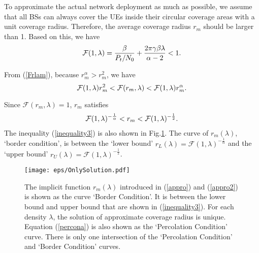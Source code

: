 \documentclass[final]{IEEEtran}
\begin{document}
\indent To approximate the actual network deployment as much as possible, we assume that all BSs can always cover the UEs inside their circular coverage areas with a unit coverage radius. Therefore, the average coverage radius $r_m$ should be larger than 1. Based on this, we have 
\begin{equation}
{\mathcal{F}}(1,\lambda)=\displaystyle\frac{\beta}{P_t/N_0}+\frac{2\pi \gamma\beta\lambda}{\alpha-2}<1.
\end{equation}

\indent From (\ref{Frlam}), because $r_m^{\alpha}>r_m^{2}$, we have
\begin{equation}
\displaystyle\mathcal{F}(1,\lambda)r_{m}^{2}<{\mathcal{F}}(r_{m},\lambda)
<\displaystyle\mathcal{F}(1,\lambda)r_{m}^{\alpha}.
\label{inequality2}
\end{equation}

Since $\mathcal{F}(r_m,\lambda)=1$,  $r_{m}$ satisfies 
\begin{equation}
\begin{array}{@{}r@{}l}
\displaystyle\mathcal{F}(1,\lambda)^{-\frac{1}{\alpha}}<r_{m}<\mathcal{F}(1,\lambda)^{-\frac{1}{2}}.
\end{array}
\label{inequality3}
\end{equation}
\indent The inequality (\ref{inequality3}) is also shown in Fig.\ref{fig:onlysolution}. The curve of $r_{m}(\lambda)$, \ie `border condition', is between the `lower bound' $r_L(\lambda)=\mathcal{F}(1,\lambda)^{-\frac{1}{\alpha}}$ and the `upper bound' $r_U(\lambda)=\mathcal{F}(1,\lambda)^{-\frac{1}{2}}$.\\
\begin{figure}
    \centering
    \texttt{[image: eps/OnlySolution.pdf]}
    \caption{The implicit function $r_{m}(\lambda)$ introduced in (\ref{appro}) and (\ref{appro2}) is shown as the curve `Border Condition'. It is between the lower bound and upper bound that are shown in (\ref{inequality3}). For each density $\lambda$, the solution of approximate coverage radius is unique. Equation (\ref{percona}) is also shown as the `Percolation Condition' curve. There is only one intersection of the `Percolation Condition' and `Border Condition' curves.}
    \label{fig:onlysolution}
\end{figure}
\end{document}
